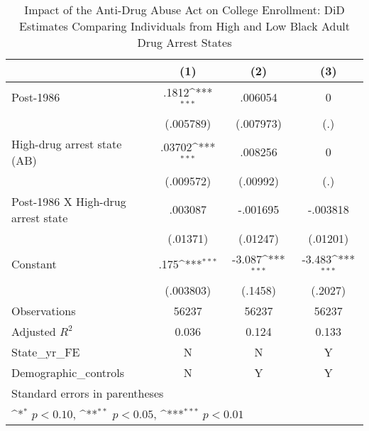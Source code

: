 \begin{table}[htbp]\centering
\def\sym#1{\ifmmode^{#1}\else\(^{#1}\)\fi}
\caption{Impact of the Anti-Drug Abuse Act on College Enrollment: DiD Estimates Comparing Individuals from High and Low Black Adult Drug Arrest States}
\begin{tabular}{l*{3}{c}}
\hline\hline
                    &\multicolumn{1}{c}{(1)}         &\multicolumn{1}{c}{(2)}         &\multicolumn{1}{c}{(3)}         \\
\hline
Post-1986           &       .1812\sym{***}&     .006054         &           0         \\
                    &   (.005789)         &   (.007973)         &         (.)         \\
[1em]
High-drug arrest state (AB)&      .03702\sym{***}&     .008256         &           0         \\
                    &   (.009572)         &    (.00992)         &         (.)         \\
[1em]
Post-1986 X High-drug arrest state&     .003087         &    -.001695         &    -.003818         \\
                    &    (.01371)         &    (.01247)         &    (.01201)         \\
[1em]
Constant            &        .175\sym{***}&      -3.087\sym{***}&      -3.483\sym{***}\\
                    &   (.003803)         &     (.1458)         &     (.2027)         \\
\hline
Observations        &       56237         &       56237         &       56237         \\
Adjusted \(R^{2}\)  &       0.036         &       0.124         &       0.133         \\
State\_yr\_FE         &           N         &           N         &           Y         \\
Demographic\_controls&           N         &           Y         &           Y         \\
\hline\hline
\multicolumn{4}{l}{\footnotesize Standard errors in parentheses}\\
\multicolumn{4}{l}{\footnotesize \sym{*} \(p<0.10\), \sym{**} \(p<0.05\), \sym{***} \(p<0.01\)}\\
\end{tabular}
\end{table}
